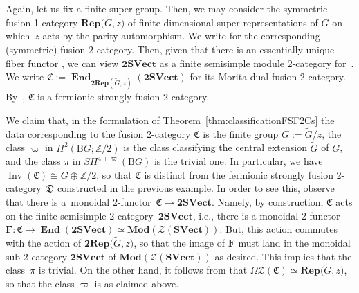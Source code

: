 \documentclass[pdftex]{sigma}
\numberwithin{equation}{section}
\begin{document}
\begin{Example}\label{ex:actionnoextension}
Again, let us fix  a finite super-group. Then, we may consider the symmetric fusion 1-category $\mathbf{Rep}\big(\widetilde{G},z\big)$ of finite dimensional super-representations of $G$ on which~$z$ acts by the parity automorphism. We write  for the corresponding (symmetric) fusion 2-category. Then, given that there is an essentially unique fiber functor , we can view $\mathbf{2SVect}$ as a finite semisimple module 2-category for~. We write
$\mathfrak{C}:=\mathbf{\operatorname{End}}_{\mathbf{2Rep}(\widetilde{G},z)}(\mathbf{2SVect})
$
 for its Morita dual fusion 2-category. By~\cite[Lemma~3.2.1]{D9}, $\mathfrak{C}$ is a fermionic strongly fusion 2-category.

We claim that, in the formulation of Theorem~\ref{thm:classificationFSF2Cs} the data corresponding to the fusion 2-category $\mathfrak{C}$ is the finite group $G:=\widetilde{G}/z$, the class $\varpi$ in $H^2(\mathrm{B}G;\mathbb{Z}/2)$ is the class classifying the central extension $\widetilde{G}$ of $G$, and the class $\pi$ in $SH^{4+\varpi}(\mathrm{B}G)$ is the trivial one. In particular, we have~${\operatorname{Inv}(\mathfrak{C})\cong G\oplus\mathbb{Z}/2}$, so that $\mathfrak{C}$ is distinct from the fermionic strongly fusion 2-category~$\mathfrak{D}$ constructed in the previous example. In order to see this, observe that there is a~monoidal 2-functor~${\mathfrak{C}\rightarrow\mathbf{2SVect}}$. Namely, by construction, $\mathfrak{C}$ acts on the finite semisimple 2-category~$\mathbf{2SVect}$, i.e., there is a monoidal 2-functor $\mathbf{F}\colon\mathfrak{C}\rightarrow \mathbf{\operatorname{End}}(\mathbf{2SVect})\simeq\mathbf{Mod}(\mathcal{Z}(\mathbf{SVect}))$. But, this action commutes with the action of $\mathbf{2Rep}\big(\widetilde{G},z\big)$, so that the image of $\mathbf{F}$ must land in the monoidal sub-2-category $\mathbf{2SVect}$ of $\mathbf{Mod}(\mathcal{Z}(\mathbf{SVect}))$ as desired. This implies that the class~$\pi$ is trivial. On the other hand, it follows from \cite[Theorem~2.3.2]{D9} that $\Omega\mathscr{Z}(\mathfrak{C})\simeq \mathbf{Rep}\big(\widetilde{G},z\big)$, so that the class $\varpi$ is as claimed above.
\end{Example}
\end{document}
